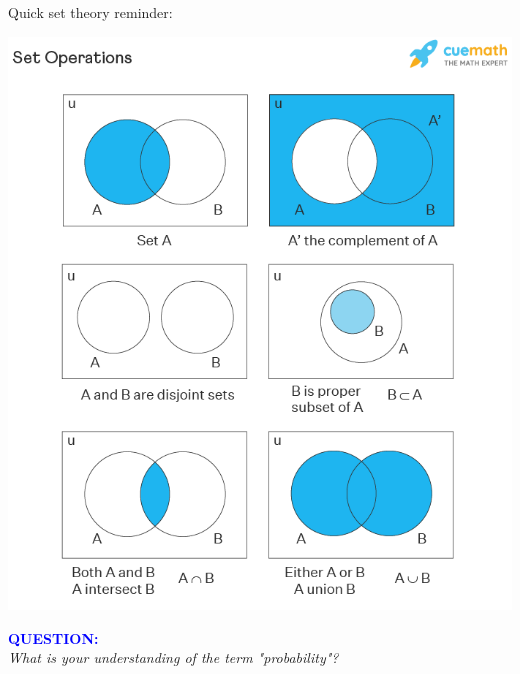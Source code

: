\documentclass{beamer}
\begin{document}
\begin{frame}{}\begin{minipage}{.35\linewidth}
     Quick set theory reminder:
\end{minipage}%
\begin{minipage}{.65\linewidth}
    \vspace{-1.2cm}
  \includegraphics[height=\paperheight]{graphics/SetOperationsold.png}
\end{minipage}
\end{frame}

\begin{frame}{}
    \begin{center}
        \textcolor{blue}{\textbf{\Large{QUESTION:}}}\bigskip\\

        \emph{\Large What is your understanding of the term "probability"?}
    \end{center}
  \end{frame}
\end{document}
